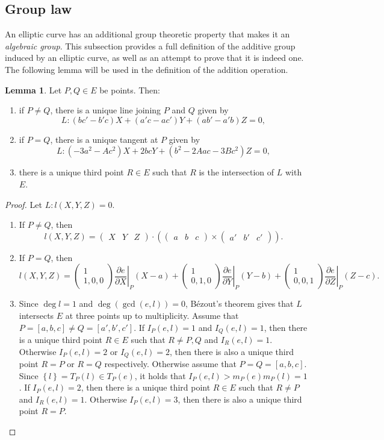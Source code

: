 \documentclass{article}
\newcommand{\val}[1]{\left. #1 \right\rvert}
\newcommand{\rb}[1]{\left( #1 \right)}
\renewcommand{\sb}[1]{\left[ #1 \right]}
\newcommand{\cb}[1]{\left\{ #1 \right\}}
\newcommand{\two}[2]{\begin{pmatrix} #1 \\ #2 \end{pmatrix}}
\newcommand{\three}[3]{\begin{pmatrix} #1 & #2 & #3 \end{pmatrix}}
\theoremstyle{definition}\newtheorem*{definition}{Definition}
\theoremstyle{definition}\newtheorem*{example}{Example}
\theoremstyle{definition}\newtheorem*{remark}{Remark}
\newtheorem{lemma}[proposition]{Lemma}
\begin{document}
\pagebreak

\subsection{Group law}

An elliptic curve has an additional group theoretic property that makes it an \emph{algebraic group}. This subsection provides a full definition of the additive group induced by an elliptic curve, as well as an attempt to prove that it is indeed one. The following lemma will be used in the definition of the addition operation.

\begin{lemma}
\label{lem:thirdpoint}
Let $ P, Q \in E $ be points. Then:
\begin{enumerate}
\item if $ P \ne Q $, there is a unique line joining $ P $ and $ Q $ given by
$$ L : \rb{bc' - b'c}X + \rb{a'c - ac'}Y + \rb{ab' - a'b}Z = 0, $$
\item if $ P = Q $, there is a unique tangent at $ P $ given by
$$ L : \rb{-3a^2 - Ac^2}X + 2bcY + \rb{b^2 - 2Aac - 3Bc^2}Z = 0, $$
\item there is a unique third point $ R \in E $ such that $ R $ is the intersection of $ L $ with $ E $.
\end{enumerate}
\end{lemma}

\begin{proof}
Let $ L : l\rb{X, Y, Z} = 0 $.
\begin{enumerate}
\item If $ P \ne Q $, then
$$ l\rb{X, Y, Z} = \three{X}{Y}{Z} \cdot \rb{\three{a}{b}{c} \times \three{a'}{b'}{c'}}. $$
\item If $ P = Q $, then
$$ l\rb{X, Y, Z} = \two{1}{1, 0, 0}\val{\dfrac{\partial e}{\partial X}}_P\rb{X - a} + \two{1}{0, 1, 0}\val{\dfrac{\partial e}{\partial Y}}_P\rb{Y - b} + \two{1}{0, 0, 1}\val{\dfrac{\partial e}{\partial Z}}_P\rb{Z - c}. $$
\item Since $ \deg l = 1 $ and $ \deg\rb{\gcd\rb{e, l}} = 0 $, Bézout's theorem gives that $ L $ intersects $ E $ at three points up to multiplicity. Assume that $ P = \sb{a, b, c} \ne Q = \sb{a', b', c'} $. If $ I_P\rb{e, l} = 1 $ and $ I_Q\rb{e, l} = 1 $, then there is a unique third point $ R \in E $ such that $ R \ne P, Q $ and $ I_R\rb{e, l} = 1 $. Otherwise $ I_P\rb{e, l} = 2 $ or $ I_Q\rb{e, l} = 2 $, then there is also a unique third point $ R = P $ or $ R = Q $ respectively. Otherwise assume that $ P = Q = \sb{a, b, c} $. Since $ \cb{l} = T_P\rb{l} \in T_P\rb{e} $, it holds that $ I_P\rb{e, l} > m_P\rb{e}m_P\rb{l} = 1 $. If $ I_P\rb{e, l} = 2 $, then there is a unique third point $ R \in E $ such that $ R \ne P $ and $ I_R\rb{e, l} = 1 $. Otherwise $ I_P\rb{e, l} = 3 $, then there is also a unique third point $ R = P $.
\end{enumerate}
\end{proof}
\end{document}
